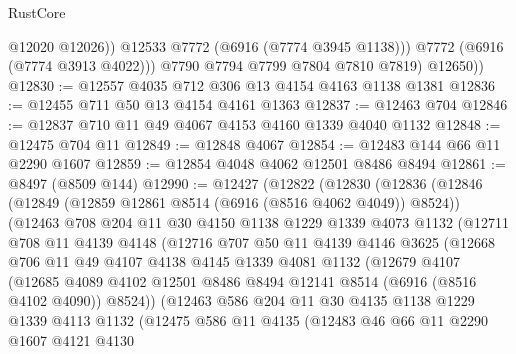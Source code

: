 \begin{lexlean}{RustCore}
\begin{coremodule}
                  @12020
                  @12026))
              @12533
              @7772
              (@6916 (@7774 @3945 @1138)))
            @7772
            (@6916 (@7774 @3913 @4022)))
          @7790
          @7794
          @7799
          @7804
          @7810
          @7819)
        @12650))
@12830 := @12557 @4035 @712 @306 @13 @4154 @4163 @1138 @1381
@12836 := @12455 @711 @50 @13 @4154 @4161 @1363
@12837 := @12463 @704
@12846 := @12837 @710 @11 @49 @4067 @4153 @4160 @1339 @4040 @1132
@12848 := @12475 @704 @11
@12849 := @12848 @4067
@12854 := @12483 @144 @66 @11 @2290 @1607
@12859 := @12854 @4048 @4062 @12501 @8486 @8494
@12861 := @8497 (@8509 @144)
@12990 := @12427
    (@12822
      (@12830
        (@12836
          (@12846
            (@12849 (@12859 @12861 @8514 (@6916 (@8516 @4062 @4049)) @8524))
            (@12463
              @708
              @204
              @11
              @30
              @4150
              @1138
              @1229
              @1339
              @4073
              @1132
              (@12711
                @708
                @11
                @4139
                @4148
                (@12716
                  @707
                  @50
                  @11
                  @4139
                  @4146
                  @3625
                  (@12668
                    @706
                    @11
                    @49
                    @4107
                    @4138
                    @4145
                    @1339
                    @4081
                    @1132
                    (@12679
                      @4107
                      (@12685
                        @4089
                        @4102
                        @12501
                        @8486
                        @8494
                        @12141
                        @8514
                        (@6916 (@8516 @4102 @4090))
                        @8524))
                    (@12463
                      @586
                      @204
                      @11
                      @30
                      @4135
                      @1138
                      @1229
                      @1339
                      @4113
                      @1132
                      (@12475
                        @586
                        @11
                        @4135
                        (@12483
                          @46
                          @66
                          @11
                          @2290
                          @1607
                          @4121
                          @4130

\end{coremodule}
\end{lexlean}

